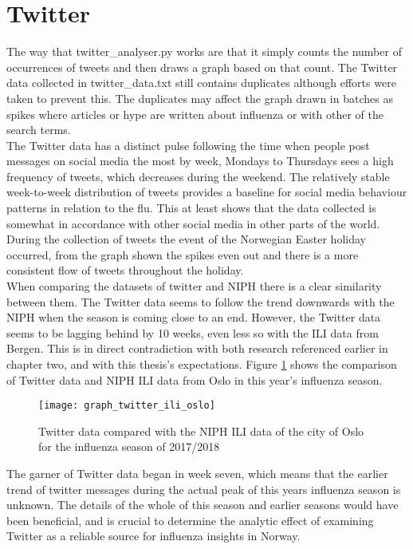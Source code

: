\section{Twitter}
The way that twitter\_analyser.py works are that it simply counts the number of occurrences of tweets and then draws a graph based on that count. The Twitter data collected in twitter\_data.txt still contains duplicates although efforts were taken to prevent this. The duplicates may affect the graph drawn in batches as spikes where articles or hype are written about influenza or with other of the search terms.
\\
The Twitter data has a distinct pulse following the time when people post messages on social media the most by week\cite{socialTrend}, Mondays to Thursdays sees a high frequency of tweets, which decreases during the weekend. The relatively stable week-to-week distribution of tweets provides a baseline for social media behaviour patterns in relation to the flu. This at least shows that the data collected is somewhat in accordance with other social media in other parts of the world. During the collection of tweets the event of the Norwegian Easter holiday occurred, from the graph shown the spikes even out and there is a more consistent flow of tweets throughout the holiday.
\\
When comparing the datasets of twitter and NIPH there is a clear similarity between them. The Twitter data seems to follow the trend downwards with the NIPH when the season is coming close to an end. However, the Twitter data seems to be lagging behind by 10 weeks, even less so with the ILI data from Bergen. This is in direct contradiction with both research referenced earlier in chapter two, and with this thesis's expectations. Figure \ref{fig:graph_twitter_ili_oslo} shows the comparison of Twitter data and NIPH ILI data from Oslo in this year's influenza season.

\begin{figure}[!htb]
\texttt{[image: graph\_twitter\_ili\_oslo]}
\centering
\caption{Twitter data compared with the NIPH ILI data of the city of Oslo for the influenza season of 2017/2018}
\label{fig:graph_twitter_ili_oslo}
\end{figure}

The garner of Twitter data began in week seven, which means that the earlier trend of twitter messages during the actual peak of this years influenza season is unknown. The details of the whole of this season and earlier seasons would have been beneficial, and is crucial to determine the analytic effect of examining Twitter as a reliable source for influenza insights in Norway.







